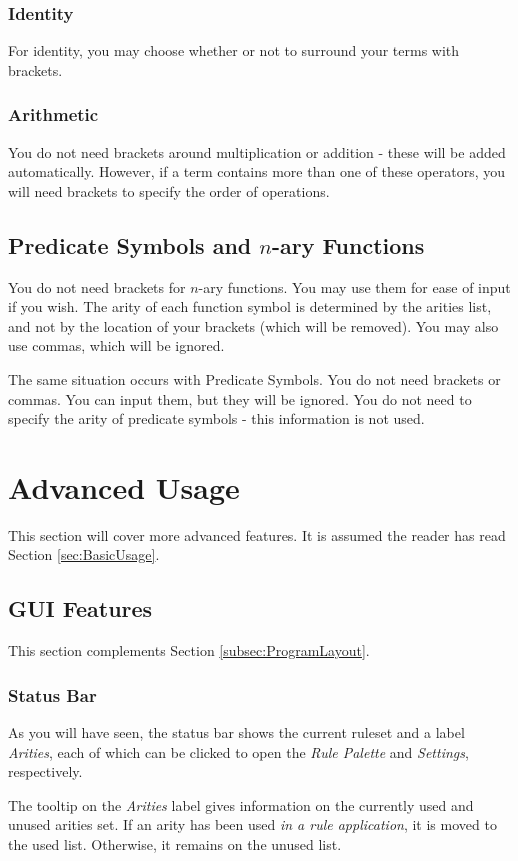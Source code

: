 \documentclass[a4paper]{article}
\begin{document}
\subsubsection{Identity}
For identity, you may choose whether or not to surround your terms with brackets.

\subsubsection{Arithmetic}
You do not need brackets around multiplication or addition - these will be added automatically. However, if a term contains more than one of these operators, you will need brackets to specify the order of operations.

\subsection{Predicate Symbols and $n$-ary Functions}
You do not need brackets for $n$-ary functions. You may use them for ease of input if you wish. The arity of each function symbol is determined by the arities list, and not by the location of your brackets (which will be removed). You may also use commas, which will be ignored.

The same situation occurs with Predicate Symbols. You do not need brackets or commas. You can input them, but they will be ignored. You do not need to specify the arity of predicate symbols - this information is not used.


\section{Advanced Usage}
This section will cover more advanced features. It is assumed the reader has read Section \ref{sec:BasicUsage}.

\subsection{GUI Features}
This section complements Section \ref{subsec:ProgramLayout}.

\subsubsection{Status Bar}
As you will have seen, the status bar shows the current ruleset and a label \emph{Arities}, each of which can be clicked to open the \emph{Rule Palette} and \emph{Settings}, respectively. 

The tooltip on the \emph{Arities} label gives information on the currently used and unused arities set. If an arity has been used \emph{in a rule application}, it is moved to the used list. Otherwise, it remains on the unused list.
\end{document}
